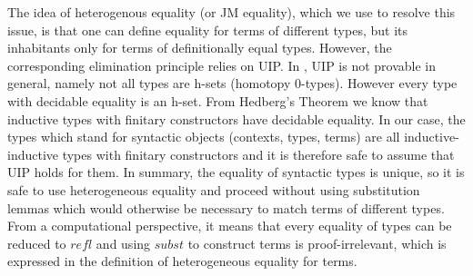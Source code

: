 \documentclass{sig-alternate}
\begin{document}
The idea of heterogenous equality (or JM equality), which we use to resolve this issue,
is that one can define equality for terms of different types, but its
inhabitants only for terms of definitionally equal types. However, the
corresponding elimination principle relies on UIP. 
In \itt{}, UIP is not provable in general,
  namely not all types are h-sets (homotopy 0-types). However every type with decidable equality is an h-set.
  From Hedberg's Theorem \cite{hed:98} we know that inductive
  types with finitary constructors have decidable equality. In our
  case, the types which stand for syntactic objects (contexts, types, terms)
  are all inductive-inductive types with finitary constructors and it is
  therefore safe to assume that UIP holds for them.
In summary, the equality of
syntactic types is unique, so it is safe to use heterogeneous equality
and proceed without using substitution lemmas which would otherwise be
necessary to match terms of different types. From a computational perspective, it means that every equality of types can be reduced to $\mathit{refl}$ and using $\mathit{subst}$ to construct terms is proof-irrelevant, which is expressed in the definition of heterogeneous equality for terms.
\end{document}
